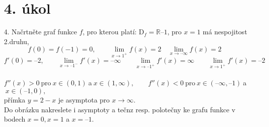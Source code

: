 \section{4. úkol}
    4. Načrtněte graf funkce $f$, pro kterou platí: $\text{D}_{f} = \mathbb{R} – {1}$, pro $x = 1$ má nespojitost 2.druhu,
	$$f(0) = f(-1) =0, \qquad \lim_{x\rightarrow 1^{+}} f(x) = 2\quad \lim_{x\rightarrow –\infty} f(x) = 2\quad$$
	$$f'(0) = –2, \qquad \lim_{x\rightarrow –1^{-}} f'(x) = – \infty \qquad \lim_{x\rightarrow –1^{+}} f'(x) = \infty \qquad  \lim_{x\rightarrow 1^{+}} f'(x) = – 2$$ \\
	$f''(x) > 0 \  $pro$ \  x \in (0,1) \ $a$ \ x \in (1,\infty), \qquad f''(x) < 0 \ $pro$ \ x \in (–\infty,–1)\  $a$ \  x \in (–1,0),$ \\
	přímka $y = 2 - x$ je asymptota pro $x\rightarrow \infty$. \\
	Do obrázku nakreslete i asymptoty a tečnz resp. polotečny ke grafu funkce v bodech $x = 0, x = 1$ a $x = –1$.
